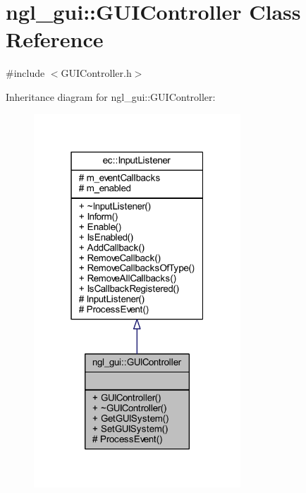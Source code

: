 \hypertarget{classngl__gui_1_1_g_u_i_controller}{}\section{ngl\+\_\+gui\+:\+:G\+U\+I\+Controller Class Reference}
\label{classngl__gui_1_1_g_u_i_controller}


{\ttfamily \#include $<$G\+U\+I\+Controller.\+h$>$}



Inheritance diagram for ngl\+\_\+gui\+:\+:G\+U\+I\+Controller\+:
\nopagebreak
\begin{figure}[H]
\begin{center}
\leavevmode
\includegraphics[width=220pt]{classngl__gui_1_1_g_u_i_controller__inherit__graph}
\end{center}
\end{figure}


